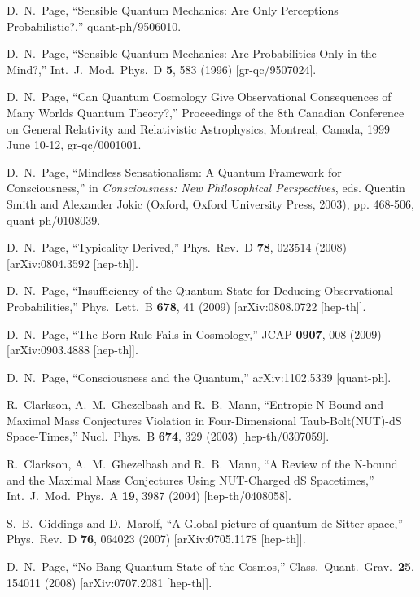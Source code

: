 \documentclass[12pt]{article}
\begin{document}
\begin{thebibliography}{99}
  D.~N.~Page,
  ``Sensible Quantum Mechanics: Are Only Perceptions Probabilistic?,''
  quant-ph/9506010.
  
  D.~N.~Page,
  ``Sensible Quantum Mechanics: Are Probabilities Only in the Mind?,''
  Int.\ J.\ Mod.\ Phys.\ D {\bf 5}, 583 (1996)
  [gr-qc/9507024].
  
  D.~N.~Page,
  ``Can Quantum Cosmology Give Observational Consequences of Many Worlds Quantum Theory?,'' Proceedings of the 8th Canadian Conference on General Relativity and Relativistic Astrophysics, Montreal, Canada, 1999 June 10-12,
  gr-qc/0001001.  
  
  D.~N.~Page,
  ``Mindless Sensationalism: A Quantum Framework for Consciousness,''
  in {\it Consciousness: New Philosophical Perspectives}, 
  eds. Quentin Smith and Alexander Jokic 
  (Oxford, Oxford University Press, 2003), pp. 468-506,
  quant-ph/0108039.  

  D.~N.~Page,
  ``Typicality Derived,''
  Phys.\ Rev.\ D {\bf 78}, 023514 (2008)
  [arXiv:0804.3592 [hep-th]].
    
  D.~N.~Page,
  ``Insufficiency of the Quantum State for Deducing Observational Probabilities,''
  Phys.\ Lett.\ B {\bf 678}, 41 (2009)
  [arXiv:0808.0722 [hep-th]].  
  
  D.~N.~Page,
  ``The Born Rule Fails in Cosmology,''
  JCAP {\bf 0907}, 008 (2009)
  [arXiv:0903.4888 [hep-th]].  

  D.~N.~Page,
  ``Consciousness and the Quantum,''
  arXiv:1102.5339 [quant-ph]. 
  
  R.~Clarkson, A.~M.~Ghezelbash and R.~B.~Mann,
  ``Entropic N Bound and Maximal Mass Conjectures Violation in Four-Dimensional Taub-Bolt(NUT)-dS Space-Times,''
  Nucl.\ Phys.\ B {\bf 674}, 329 (2003)
  [hep-th/0307059].  
  
  R.~Clarkson, A.~M.~Ghezelbash and R.~B.~Mann,
  ``A Review of the N-bound and the Maximal Mass Conjectures Using NUT-Charged dS Spacetimes,''
  Int.\ J.\ Mod.\ Phys.\ A {\bf 19}, 3987 (2004)
  [hep-th/0408058].

  S.~B.~Giddings and D.~Marolf,
  ``A Global picture of quantum de Sitter space,''
  Phys.\ Rev.\ D {\bf 76}, 064023 (2007)
  [arXiv:0705.1178 [hep-th]].
    
  D.~N.~Page,
  ``No-Bang Quantum State of the Cosmos,''
  Class.\ Quant.\ Grav.\  {\bf 25}, 154011 (2008)
  [arXiv:0707.2081 [hep-th]].


\end{thebibliography}
\end{document}
